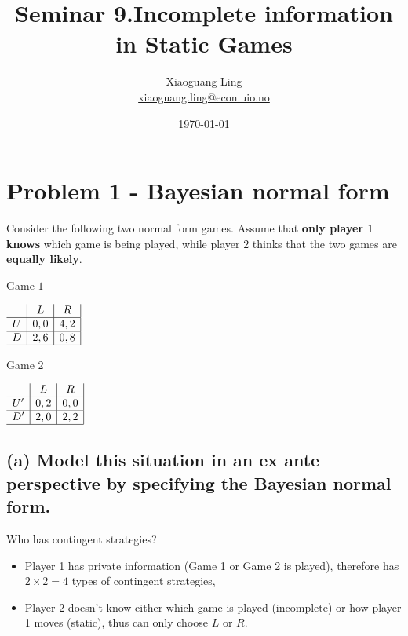\documentclass{article}
\title{Seminar 9.Incomplete information in Static Games}
\author{Xiaoguang Ling \\  \href{xiaoguang.ling@econ.uio.no}{xiaoguang.ling@econ.uio.no}}
\date{\today}
\begin{document}
\maketitle

\section{Problem 1 - Bayesian normal form}

Consider the following two normal form games. Assume that \textbf{only player $1$ knows} which game is being played, while player $2$ thinks that the two games are \textbf{equally likely}.\vspace{-21pt}

\begin{center}
Game $1$ \vspace{6pt}

$
\begin{array}{c|c|c|}
 & L & R \\
\hline
U & 0,0 & 4,2 \\
\hline
D & 2,6 & 0,8 \\
\hline
\end{array}
$
\end{center}

\begin{center}
Game $2$ \vspace{6pt}

$
\begin{array}{c|c|c|}
 & L & R \\
\hline
U' & 0,2 & 0,0 \\
\hline
D' & 2,0 & 2,2 \\
\hline
\end{array}
$
\end{center}

\subsection*{(a) Model this situation in an ex ante perspective by specifying the Bayesian normal form.}

\begin{mdframed}[backgroundcolor=blue!20,linecolor=white]

Who has contingent strategies?

\begin{itemize}
\item Player 1 has private information (Game 1 or Game 2 is played), therefore has $2 \times 2 = 4$ types of contingent strategies,
\item Player 2 doesn't know either which game is played (incomplete) or how player 1 moves (static), thus can only choose $L$ or $R$.
\end{itemize}
\end{mdframed}
\end{document}
